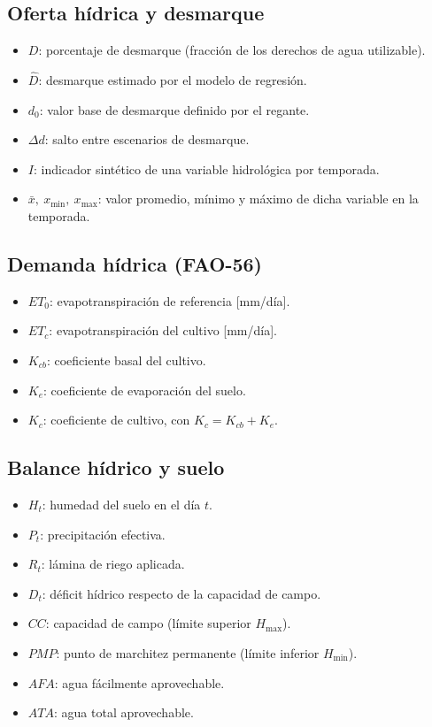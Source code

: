\documentclass[12pt]{report}
\begin{document}
\subsection*{Oferta hídrica y desmarque}

\begin{itemize}
    \item $D$: porcentaje de desmarque (fracción de los derechos de agua utilizable).
    \item $\hat{D}$: desmarque estimado por el modelo de regresión.
    \item $d_0$: valor base de desmarque definido por el regante.
    \item $\Delta d$: salto entre escenarios de desmarque.
    \item $I$: indicador sintético de una variable hidrológica por temporada.
    \item $\bar{x},\ x_{\min},\ x_{\max}$: valor promedio, mínimo y máximo de dicha variable en la temporada.
\end{itemize}

\subsection*{Demanda hídrica (FAO-56)}

\begin{itemize}
    \item $ET_0$: evapotranspiración de referencia [mm/día].
    \item $ET_c$: evapotranspiración del cultivo [mm/día].
    \item $K_{cb}$: coeficiente basal del cultivo.
    \item $K_e$: coeficiente de evaporación del suelo.
    \item $K_c$: coeficiente de cultivo, con $K_c = K_{cb} + K_e$.
\end{itemize}

\subsection*{Balance hídrico y suelo}

\begin{itemize}
    \item $H_t$: humedad del suelo en el día $t$.
    \item $P_t$: precipitación efectiva.
    \item $R_t$: lámina de riego aplicada.
    \item $D_t$: déficit hídrico respecto de la capacidad de campo.
    \item $CC$: capacidad de campo (límite superior $H_{\max}$).
    \item $PMP$: punto de marchitez permanente (límite inferior $H_{\min}$).
    \item $AFA$: agua fácilmente aprovechable.
    \item $ATA$: agua total aprovechable.
\end{itemize}
\end{document}
